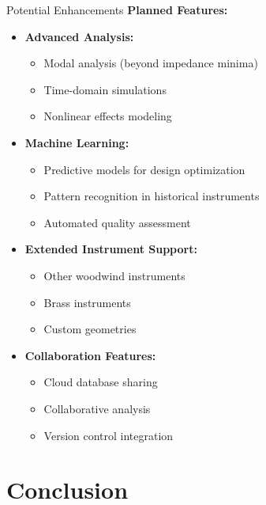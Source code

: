 \documentclass[aspectratio=169,10pt]{beamer}
\begin{document}
\begin{frame}{Potential Enhancements}
\textbf{Planned Features:}

\begin{itemize}
    \item \textbf{Advanced Analysis:}
    \begin{itemize}
        \item Modal analysis (beyond impedance minima)
        \item Time-domain simulations
        \item Nonlinear effects modeling
    \end{itemize}
    
    \item \textbf{Machine Learning:}
    \begin{itemize}
        \item Predictive models for design optimization
        \item Pattern recognition in historical instruments
        \item Automated quality assessment
    \end{itemize}
    
    \item \textbf{Extended Instrument Support:}
    \begin{itemize}
        \item Other woodwind instruments
        \item Brass instruments
        \item Custom geometries
    \end{itemize}
    
    \item \textbf{Collaboration Features:}
    \begin{itemize}
        \item Cloud database sharing
        \item Collaborative analysis
        \item Version control integration
    \end{itemize}
\end{itemize}
\end{frame}

\section{Conclusion}
\end{document}
